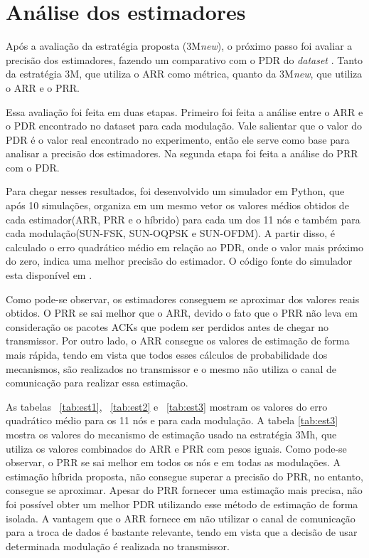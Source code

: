 \section{Análise dos estimadores}
\label{res:estimadores}

Após a avaliação da estratégia proposta (3M\textit{new}), o próximo passo foi avaliar a precisão dos estimadores, fazendo um comparativo com o PDR do \textit{dataset} \cite{tuset2020evaluating}. Tanto da estratégia 3M, que utiliza o ARR como métrica, quanto da 3M\textit{new}, que utiliza o ARR e o PRR. 

Essa avaliação foi feita em duas etapas. Primeiro foi feita a análise entre o ARR e o PDR encontrado no dataset \cite{tuset2020evaluating} para cada modulação. Vale salientar que o valor do PDR é o valor real encontrado no experimento, então ele serve como base para analisar a precisão dos estimadores. Na segunda etapa foi feita a análise do PRR com o PDR. 

Para chegar nesses resultados, foi desenvolvido um simulador em 
Python, que após 10 simulações, organiza em um mesmo vetor os valores médios obtidos de cada estimador(ARR, PRR e o híbrido) para cada um dos 11 nós e também para cada modulação(SUN-FSK, SUN-OQPSK e SUN-OFDM). A partir disso, é calculado o erro quadrático médio em relação ao PDR, onde o valor mais próximo do zero, indica uma melhor precisão do estimador. O código fonte do simulador esta disponível em \cite{GitDiego}.

Como pode-se observar, os estimadores conseguem se aproximar dos valores reais obtidos. O PRR se sai melhor que o ARR, devido o fato que o PRR não leva em consideração os pacotes ACKs que podem ser perdidos antes de chegar no transmissor. Por outro lado, o ARR consegue os valores de estimação de forma mais rápida, tendo em vista que todos esses cálculos de probabilidade dos mecanismos, são realizados no transmissor e o mesmo não utiliza o canal de comunicação para realizar essa estimação. 

As tabelas ~\ref{tab:est1}, ~\ref{tab:est2} e ~\ref{tab:est3} mostram os valores do erro quadrático médio para os 11 nós e para cada modulação. A tabela \ref{tab:est3} mostra os valores do mecanismo de estimação usado na estratégia 3Mh, que utiliza os valores combinados do ARR e PRR com pesos iguais. Como pode-se observar, o PRR se sai melhor em todos os nós e em todas as modulações. A estimação híbrida proposta, não consegue superar a precisão do PRR, no entanto, consegue se aproximar. Apesar do PRR fornecer uma estimação mais precisa, não foi possível obter um melhor PDR utilizando esse método de estimação de forma isolada. A vantagem que o ARR fornece em não utilizar o canal de comunicação para a troca de dados é bastante relevante, tendo em vista que a decisão de usar determinada modulação é realizada no transmissor. 

